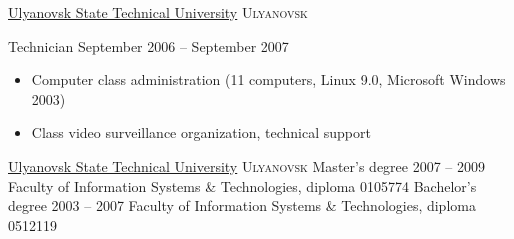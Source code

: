 \documentclass[unicode, 10pt, a4paper, oneside, fleqn]{article}
\begin{document}

\job
    {\href{http://www.ulstu.ru}{Ulyanovsk State Technical University}}
    {\textsc{Ulyanovsk}}
    {
        \position
            {Technician}
            {September 2006 -- September 2007}
            {
                \begin{itemize}
                    \item{Computer class administration (11 computers,
                           Linux 9.0, Microsoft Windows 2003})
                    \item{Class video surveillance organization, technical support}
                \end{itemize}
            }
    }



\job
    {\href{http://www.ulstu.ru}{Ulyanovsk State Technical University}}
    {\textsc{Ulyanovsk}}
    {
        \positionnobreak
            {Master's degree}
            {2007 -- 2009}
            {Faculty of Information Systems \& Technologies, diploma  0105774}
        \positionnobreak
            {Bachelor's degree}
            {2003 -- 2007}
            {Faculty of Information Systems \& Technologies, diploma  0512119}
    }

\end{document}
